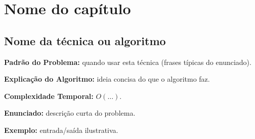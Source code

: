 
\chapter{Nome do capítulo}

\section{Nome da técnica ou algoritmo}

\textbf{Padrão do Problema:} quando usar esta técnica (frases típicas do enunciado).

\textbf{Explicação do Algoritmo:} ideia concisa do que o algoritmo faz.

\textbf{Complexidade Temporal:} $O(\ldots)$.

\begin{exemplodiabox}
\textbf{Enunciado:} descrição curta do problema.

\textbf{Exemplo:} entrada/saída ilustrativa.
\end{exemplodiabox}


